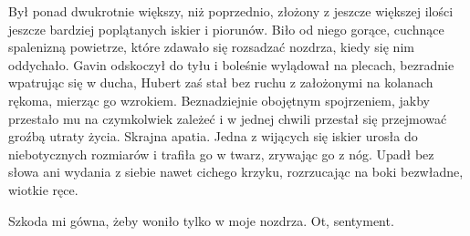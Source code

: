 \documentclass[../MAIN.tex]{subfiles}
\begin{document}
Był ponad dwukrotnie większy, niż poprzednio, złożony z jeszcze większej ilości jeszcze bardziej poplątanych iskier i piorunów. Biło od niego gorące, cuchnące spalenizną powietrze, które zdawało się rozsadzać nozdrza, kiedy się nim oddychało. Gavin odskoczył do tyłu i boleśnie wylądował na plecach, bezradnie wpatrując się w ducha, Hubert zaś stał bez ruchu z założonymi na kolanach rękoma, mierząc go wzrokiem. Beznadziejnie obojętnym spojrzeniem, jakby przestało mu na czymkolwiek zależeć i w jednej chwili przestał się przejmować groźbą utraty życia. Skrajna apatia.
Jedna z wijących się iskier urosła do niebotycznych rozmiarów i trafiła go w twarz, zrywając go z nóg. Upadł bez słowa ani wydania z siebie nawet cichego krzyku, rozrzucając na boki bezwładne, wiotkie ręce.


Szkoda mi gówna, żeby woniło tylko w moje nozdrza. Ot, sentyment.
\end{document}
